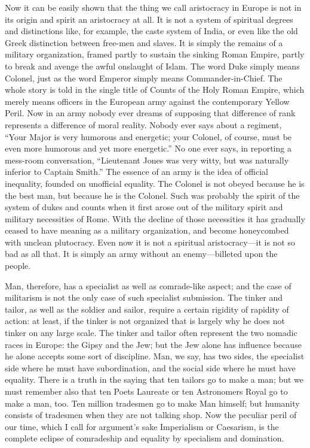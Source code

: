 \documentclass{book}
\begin{document}
Now it can be easily shown that the thing we call aristocracy in Europe is not in its origin and spirit an aristocracy at all. It is not a system of spiritual degrees and distinctions like, for example, the caste system of India, or even like the old Greek distinction between free-men and slaves. It is simply the remains of a military organization, framed partly to sustain the sinking Roman Empire, partly to break and avenge the awful onslaught of Islam. The word Duke simply means Colonel, just as the word Emperor simply means Commander-in-Chief. The whole story is told in the single title of Counts of the Holy Roman Empire, which merely means officers in the European army against the contemporary Yellow Peril. Now in an army nobody ever dreams of supposing that difference of rank represents a difference of moral reality. Nobody ever says about a regiment, “Your Major is very humorous and energetic; your Colonel, of course, must be even more humorous and yet more energetic.” No one ever says, in reporting a mess-room conversation, “Lieutenant Jones was very witty, but was naturally inferior to Captain Smith.” The essence of an army is the idea of official inequality, founded on unofficial equality. The Colonel is not obeyed because he is the best man, but because he is the Colonel. Such was probably the spirit of the system of dukes and counts when it first arose out of the military spirit and military necessities of Rome. With the decline of those necessities it has gradually ceased to have meaning as a military organization, and become honeycombed with unclean plutocracy. Even now it is not a spiritual aristocracy—it is not so bad as all that. It is simply an army without an enemy—billeted upon the people.

Man, therefore, has a specialist as well as comrade-like aspect; and the case of militarism is not the only case of such specialist submission. The tinker and tailor, as well as the soldier and sailor, require a certain rigidity of rapidity of action: at least, if the tinker is not organized that is largely why he does not tinker on any large scale. The tinker and tailor often represent the two nomadic races in Europe: the Gipsy and the Jew; but the Jew alone has influence because he alone accepts some sort of discipline. Man, we say, has two sides, the specialist side where he must have subordination, and the social side where he must have equality. There is a truth in the saying that ten tailors go to make a man; but we must remember also that ten Poets Laureate or ten Astronomers Royal go to make a man, too. Ten million tradesmen go to make Man himself; but humanity consists of tradesmen when they are not talking shop. Now the peculiar peril of our time, which I call for argument’s sake Imperialism or Caesarism, is the complete eclipse of comradeship and equality by specialism and domination.
\end{document}
